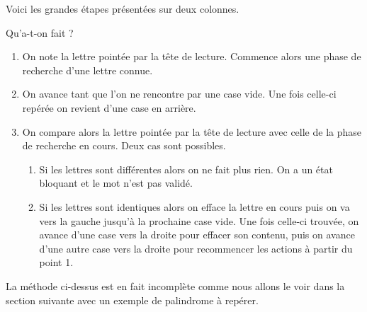 Voici les grandes étapes présentées sur deux colonnes.




\vspace{-1em}


Qu'a-t-on fait ?
\begin{enumerate}
	\item On note la lettre pointée par la tête de lecture.
	      Commence alors une phase de recherche d'une lettre connue.

	\item On avance tant que l'on ne rencontre par une case vide. Une fois celle-ci repérée on revient d'une case en arrière.
	
	\item On compare alors la lettre pointée par la tête de lecture avec celle de la phase de recherche en cours. Deux cas sont possibles.
	\begin{enumerate}
		\item Si les lettres sont différentes alors on ne fait plus rien. 
		      On a un état bloquant et le mot n'est pas validé.

		\item Si les lettres sont identiques alors on efface la lettre en cours puis on va vers la gauche jusqu'à la prochaine case vide. 
		      Une fois celle-ci trouvée, on avance d'une case vers la droite pour effacer son contenu, puis on avance d'une autre case vers la droite pour recommencer les actions à partir du point 1.
	\end{enumerate}
\end{enumerate}


La méthode ci-dessus est en fait incomplète comme nous allons le voir dans la section suivante avec un exemple de palindrome à repérer.

